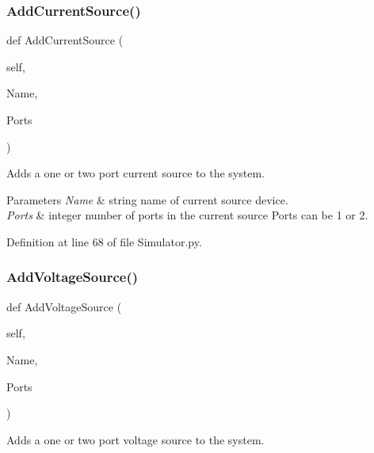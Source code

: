 \subsubsection{\texorpdfstring{Add\+Current\+Source()}{AddCurrentSource()}}
{\footnotesize\ttfamily def Add\+Current\+Source (\begin{DoxyParamCaption}\item[{}]{self,  }\item[{}]{Name,  }\item[{}]{Ports }\end{DoxyParamCaption})}



Adds a one or two port current source to the system. 


\begin{DoxyParams}{Parameters}
{\em Name} & string name of current source device. \\
\hline
{\em Ports} & integer number of ports in the current source Ports can be 1 or 2. \\
\hline
\end{DoxyParams}


Definition at line 68 of file Simulator.\+py.

\mbox{\label{classSignalIntegrity_1_1SystemDescriptions_1_1Simulator_1_1Simulator_ade4e57186554be52881092b572eac2ba}} 
\subsubsection{\texorpdfstring{Add\+Voltage\+Source()}{AddVoltageSource()}}
{\footnotesize\ttfamily def Add\+Voltage\+Source (\begin{DoxyParamCaption}\item[{}]{self,  }\item[{}]{Name,  }\item[{}]{Ports }\end{DoxyParamCaption})}



Adds a one or two port voltage source to the system. 


